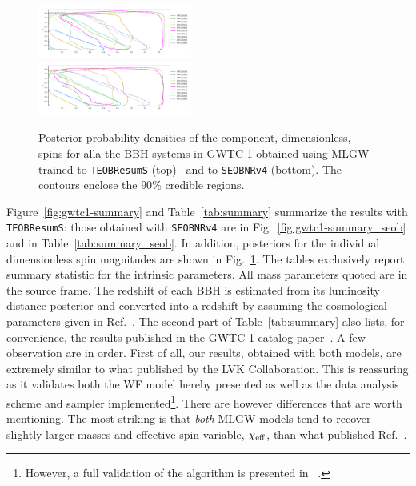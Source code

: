 \begin{figure}[t]
	\centering
    \includegraphics[width=0.45\textwidth]{img/spins.pdf}\\
        \includegraphics[width=0.45\textwidth]{img/spins_seob.pdf}
	\caption{Posterior probability densities of the component, dimensionless, spins for alla the BBH systems in GWTC-1 
	obtained using MLGW trained to {\tt TEOBResumS} (top)~\cite{Nagar:2020pcj}  and to {\tt SEOBNRv4} (bottom). 
	The contours enclose the $90\%$ credible regions.}
	\label{fig:gwtc1_eob_spins}
\end{figure}
Figure~\ref{fig:gwtc1-summary} and Table~\ref{tab:summary} summarize the results
with {\tt TEOBResumS}: those obtained with {\tt SEOBNRv4} are in Fig.~\ref{fig:gwtc1-summary_seob}
and in Table~\ref{tab:summary_seob}. In addition, posteriors for the individual dimensionless
spin magnitudes are shown in Fig.~\ref{fig:gwtc1_eob_spins}. The tables exclusively report
summary statistic for the intrinsic parameters. All mass parameters quoted are in the source frame. 
The redshift of each BBH is estimated from its luminosity distance posterior and 
converted into a redshift by assuming the cosmological parameters given in Ref.~\cite{}.
The second part of Table~\ref{tab:summary} also lists, for convenience, the results
published in the GWTC-1 catalog paper~\cite{LIGOScientific:2018mvr}.
A few observation are in order. First of all, our results, obtained with both models,
are extremely similar to what published by the LVK Collaboration. 
This is reassuring as it validates both the WF model hereby presented 
as well as the data analysis scheme and sampler 
implemented\footnote{However, a full validation of the algorithm is presented in ~\cite{}.}.
There are however differences that are worth mentioning. The most striking is that
{\it both} MLGW models tend to recover slightly larger masses and effective 
spin variable, $\chi_{\rm eff}$, than what published Ref.~\cite{LIGOScientific:2018mvr}.
